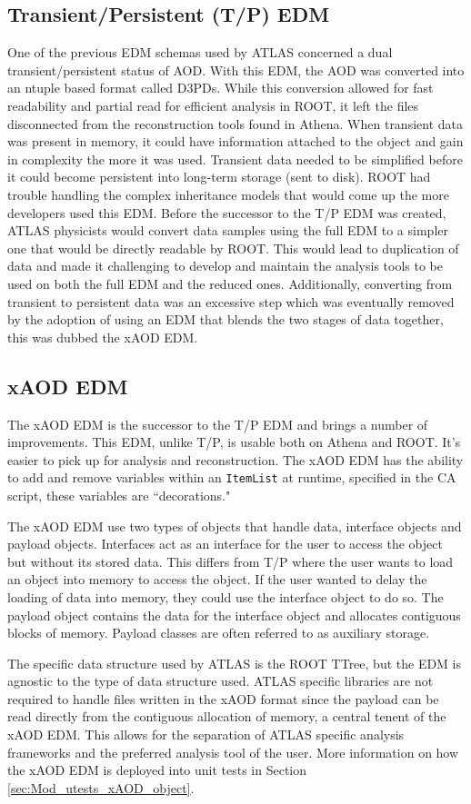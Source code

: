 \subsection{Transient/Persistent (T/P) EDM}
One of the previous EDM schemas used by ATLAS concerned a dual transient/persistent status of AOD.
With this EDM, the AOD was converted into an ntuple based format called D3PDs. 
While this conversion allowed for fast readability and partial read for efficient analysis in ROOT, it left the files disconnected from the reconstruction tools found in Athena.\cite{Athena_xAOD_design}
When transient data was present in memory, it could have information attached to the object and gain in complexity the more it was used.
Transient data needed to be simplified before it could become persistent into long-term storage (sent to disk). 
ROOT had trouble handling the complex inheritance models that would come up the more developers used this EDM. 
Before the successor to the T/P EDM was created, ATLAS physicists would convert data samples using the full EDM to a simpler one that would be directly readable by ROOT.
This would lead to duplication of data and made it challenging to develop and maintain the analysis tools to be used on both the full EDM and the reduced ones.
Additionally, converting from transient to persistent data was an excessive step which was eventually removed by the adoption of using an EDM that blends the two stages of data together, this was dubbed the xAOD EDM.


\subsection{xAOD EDM}
The xAOD EDM is the successor to the T/P EDM and brings a number of improvements.\cite{Buckley_2015}
This EDM, unlike T/P, is usable both on Athena and ROOT.
It's easier to pick up for analysis and reconstruction. 
The xAOD EDM has the ability to add and remove variables within an \verb|ItemList| at runtime, specified in the CA script, these variables are ``decorations."

The xAOD EDM use two types of objects that handle data, interface objects and payload objects. 
Interfaces act as an interface for the user to access the object but without its stored data. 
This differs from T/P where the user wants to load an object into memory to access the object. 
If the user wanted to delay the loading of data into memory, they could use the interface object to do so. 
The payload object contains the data for the interface object and allocates contiguous blocks of memory. 
Payload classes are often referred to as auxiliary storage. 

The specific data structure used by ATLAS is the ROOT TTree, but the EDM is agnostic to the type of data structure used. 
ATLAS specific libraries are not required to handle files written in the xAOD format since the payload can be read directly from the contiguous allocation of memory, a central tenent of the xAOD EDM.
This allows for the separation of ATLAS specific analysis frameworks and the preferred analysis tool of the user.
More information on how the xAOD EDM is deployed into unit tests in Section \ref{sec:Mod_utests_xAOD_object}.

